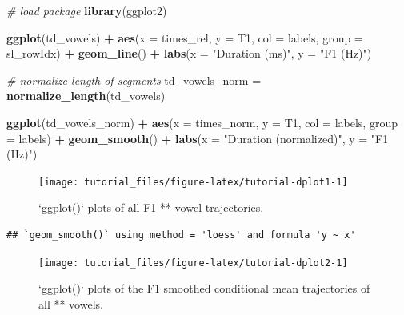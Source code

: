 \documentclass[]{book}
\newenvironment{Shaded}{\begin{snugshade}}{\end{snugshade}}
\newcommand{\CommentTok}[1]{\textcolor[rgb]{0.56,0.35,0.01}{\textit{#1}}}
\newcommand{\DataTypeTok}[1]{\textcolor[rgb]{0.13,0.29,0.53}{#1}}
\newcommand{\KeywordTok}[1]{\textcolor[rgb]{0.13,0.29,0.53}{\textbf{#1}}}
\newcommand{\NormalTok}[1]{#1}
\newcommand{\OperatorTok}[1]{\textcolor[rgb]{0.81,0.36,0.00}{\textbf{#1}}}
\newcommand{\StringTok}[1]{\textcolor[rgb]{0.31,0.60,0.02}{#1}}
\theoremstyle{definition}
\theoremstyle{definition}
\theoremstyle{definition}
\theoremstyle{remark}
\begin{document}
\begin{Shaded}
\begin{Highlighting}[]
\CommentTok{# load package}
\KeywordTok{library}\NormalTok{(ggplot2)}

\KeywordTok{ggplot}\NormalTok{(td_vowels) }\OperatorTok{+}
\StringTok{  }\KeywordTok{aes}\NormalTok{(}\DataTypeTok{x =}\NormalTok{ times_rel, }\DataTypeTok{y =}\NormalTok{ T1, }\DataTypeTok{col =}\NormalTok{ labels, }\DataTypeTok{group =}\NormalTok{ sl_rowIdx) }\OperatorTok{+}
\StringTok{  }\KeywordTok{geom_line}\NormalTok{() }\OperatorTok{+}
\StringTok{  }\KeywordTok{labs}\NormalTok{(}\DataTypeTok{x =} \StringTok{"Duration (ms)"}\NormalTok{, }\DataTypeTok{y =} \StringTok{"F1 (Hz)"}\NormalTok{)}

\CommentTok{# normalize length of segments}
\NormalTok{td_vowels_norm =}\StringTok{ }\KeywordTok{normalize_length}\NormalTok{(td_vowels)}

\KeywordTok{ggplot}\NormalTok{(td_vowels_norm) }\OperatorTok{+}
\StringTok{  }\KeywordTok{aes}\NormalTok{(}\DataTypeTok{x =}\NormalTok{ times_norm, }\DataTypeTok{y =}\NormalTok{ T1, }\DataTypeTok{col =}\NormalTok{ labels, }\DataTypeTok{group =}\NormalTok{ labels) }\OperatorTok{+}
\StringTok{  }\KeywordTok{geom_smooth}\NormalTok{() }\OperatorTok{+}
\StringTok{  }\KeywordTok{labs}\NormalTok{(}\DataTypeTok{x =} \StringTok{"Duration (normalized)"}\NormalTok{, }\DataTypeTok{y =} \StringTok{"F1 (Hz)"}\NormalTok{) }
\end{Highlighting}
\end{Shaded}

\begin{figure}

{\centering \texttt{[image: tutorial\_files/figure-latex/tutorial-dplot1-1]} 

}

\caption{`ggplot()` plots of all F1 *\@* vowel trajectories.}\label{fig:tutorial-dplot1}
\end{figure}

\begin{verbatim}
## `geom_smooth()` using method = 'loess' and formula 'y ~ x'
\end{verbatim}

\begin{figure}

{\centering \texttt{[image: tutorial\_files/figure-latex/tutorial-dplot2-1]} 

}

\caption{`ggplot()` plots of the F1 smoothed conditional mean trajectories of all *\@* vowels.}\label{fig:tutorial-dplot2}
\end{figure}
\end{document}
